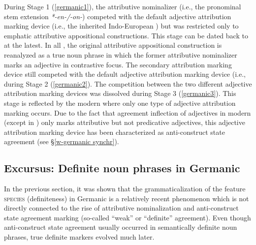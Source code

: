 {During Stage 1 (\ref{germanic1}), the attributive nominalizer (i.e., the pronominal stem extension \textit{*-en-/-on-}) competed with the default adjective attribution marking device (i.e., the inherited Indo-European ) but was restricted only to emphatic attributive appositional constructions. This stage can be dated back to  at the latest. In all , the original attributive appositional construction is reanalyzed as a true noun phrase in which the former attributive nominalizer marks an adjective in contrastive focus. The secondary attribution marking device still competed with the default adjective attribution marking device (i.e.,  during Stage 2 (\ref{germanic2}). The competition between the two different adjective attribution marking devices was dissolved during Stage 3 (\ref{germanic3}). This stage is reflected by the modern  where only one type of adjective attribution marking occurs. Due to the fact that agreement inflection of adjectives in modern  (except in ) only marks attributive but not predicative adjectives, this adjective attribution marking device has been characterized as anti\hyp{}construct state agreement (see \S\ref{w-germanic synchr}).

\subsection[Definite noun phrases in Germanic]{Excursus: Definite noun phrases in Germanic}
In the previous section, it was shown that the grammaticalization of the feature \textsc{species} (definiteness) in Germanic is a relatively recent phenomenon which is not directly connected to the rise of attributive nominalization and anti\hyp{}construct state agreement marking (so-called “weak” or “definite” agreement). Even though anti\hyp{}construct state agreement usually occurred in semantically definite noun phrases, true definite markers evolved much later.

}
